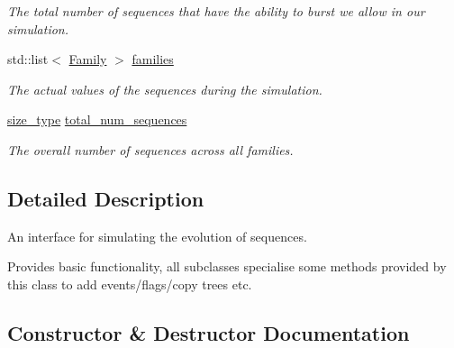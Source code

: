 \begin{DoxyCompactItemize}
\begin{DoxyCompactList}\small\item\em The total number of sequences that have the ability to burst we allow in our simulation. \end{DoxyCompactList}\item 
std\+::list$<$ \mbox{\hyperlink{classrcombinator_1_1Family}{Family}} $>$ \mbox{\hyperlink{classrcombinator_1_1Evolution_a32a114f62cd6b0f075b8dc47fe86514e}{families}}
\begin{DoxyCompactList}\small\item\em The actual values of the sequences during the simulation. \end{DoxyCompactList}\item 
\mbox{\label{classrcombinator_1_1Evolution_ad0556b6be2ae850c2e3627627412c8f9}} 
\mbox{\hyperlink{constants_8h_abcd18a5521fc90ff6e7b00e4fee98397}{size\+\_\+type}} \mbox{\hyperlink{classrcombinator_1_1Evolution_ad0556b6be2ae850c2e3627627412c8f9}{total\+\_\+num\+\_\+sequences}}
\begin{DoxyCompactList}\small\item\em The overall number of sequences across all families. \end{DoxyCompactList}\end{DoxyCompactItemize}


\subsection{Detailed Description}
An interface for simulating the evolution of sequences. 

Provides basic functionality, all subclasses specialise some methods provided by this class to add events/flags/copy trees etc. 

\subsection{Constructor \& Destructor Documentation}
\mbox{\label{classrcombinator_1_1Evolution_a0aa94cf8dd5f6184535faf82842337fd}} 
